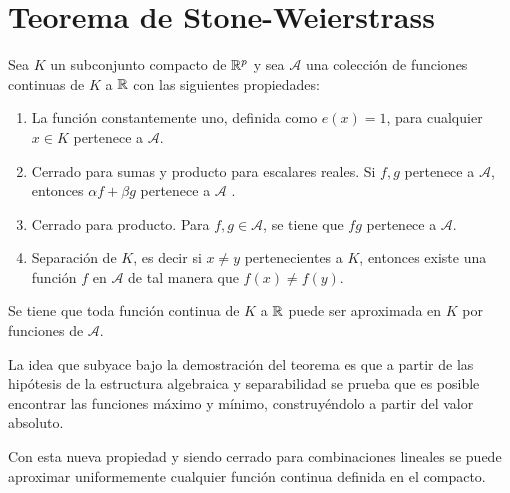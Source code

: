 %

\section{Teorema de Stone-Weierstrass }\label{ch:TeoremaStoneWeiertrass}

\begin{teorema}

    Sea $K$ un subconjunto compacto de $\mathbb{R}^p$ y sea $\mathcal{A}$ una colección de 
    funciones continuas de $K$ a $\mathbb{R}$ con las siguientes propiedades: 

    \begin{enumerate}
        \item La función constantemente uno, definida como $e(x)=1$, para cualquier $x\in K$ pertenece a $\mathcal{A}$.
        \item Cerrado para sumas y producto para escalares reales. Si $f,g$ pertenece a  $\mathcal{A}$, entonces $\alpha f + \beta g$ pertenece a $\mathcal{A}$ . 
        \item Cerrado para producto. Para $f,g \in \mathcal A$, se tiene que $fg$ pertenece a $\mathcal{A}$. 
        \item Separación de $K$, es decir si $x \neq y$ pertenecientes a $K$, entonces existe una función $f$ en $\mathcal{A}$  de tal manera que $f(x) \neq f(y)$. 
    \end{enumerate}
    
    Se tiene que toda función continua de $K$ a $\mathbb{R}$ puede ser aproximada en $K$ por funciones de $\mathcal A$. 

\end{teorema}  

La idea que subyace bajo la demostración del teorema es que a partir de las hipótesis de la estructura algebraica y separabilidad se prueba que es posible encontrar las funciones máximo y mínimo, construyéndolo a partir del valor absoluto.   

Con esta nueva propiedad y siendo cerrado para combinaciones lineales se puede aproximar uniformemente cualquier función continua definida en el compacto. 

